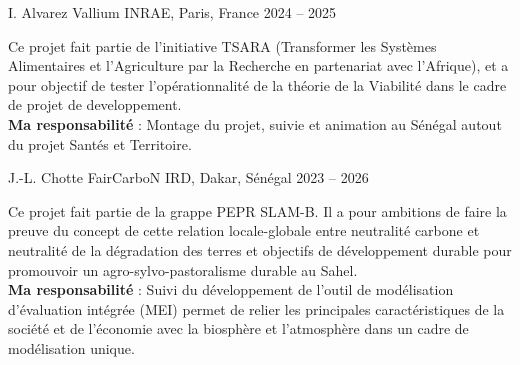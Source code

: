 

\begin{cventries}

\cventry
{I. Alvarez} %
{Vallium} %
{INRAE, Paris, France} %
{2024 -- 2025} %
{
  \begin{cvitems} %
    Ce projet fait partie de l'initiative TSARA (Transformer les Systèmes Alimentaires et l’Agriculture par la Recherche en partenariat avec l’Afrique), et a pour objectif de tester l'opérationnalité de la théorie de la Viabilité dans le cadre de projet de developpement. \\
    \textbf{Ma responsabilité } : Montage du projet, suivie et animation au Sénégal autout du projet Santés et Territoire.
  \end{cvitems}
}  
\cventry
{J.-L. Chotte} %
{FairCarboN} %
{IRD, Dakar, Sénégal} %
{2023 -- 2026} %
{
  \begin{cvitems} %
    Ce projet fait partie de la grappe PEPR SLAM-B. Il a pour ambitions de faire la preuve du concept de cette relation locale-globale entre neutralité carbone et neutralité de la dégradation des terres et objectifs de développement durable pour promouvoir un agro-sylvo-pastoralisme durable au Sahel. \\
    \textbf{Ma responsabilité } : Suivi du développement de l'outil de modélisation d'évaluation intégrée (MEI) permet de relier les principales caractéristiques de la société et de l'économie avec la biosphère et l'atmosphère dans un cadre de modélisation unique.
  \end{cvitems}
}


\end{cventries}
